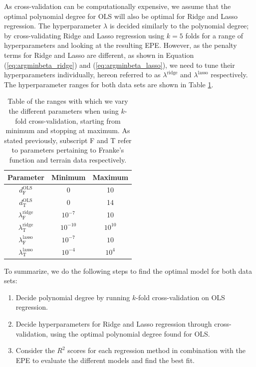 \documentclass[a4paper, 10pt]{article}
\begin{document}
\begin{multicols}{2}
As cross-validation can be computationally expensive, we assume that the optimal polynomial degree for OLS will also be optimal for Ridge and Lasso regression. The hyperparameter $\lambda$ is decided similarly to the polynomial degree; by cross-validating  Ridge and Lasso regression using $k=5$ folds for a range of hyperparameters and looking at the resulting EPE. However, as the penalty terms for Ridge and Lasso are different, as shown in Equation (\ref{eq:argminbeta_ridge}) and (\ref{eq:argminbeta_lasso}),  we need to tune their hyperparameters individually, hereon referred to as $\lambda^\text{ridge}$ and $\lambda^\text{lasso}$ respectively. The hyperparameter ranges for both data sets  are shown in Table \ref{tab:parameters_kfold}.
\begin{table}[H]
\caption{Table of the ranges with which we vary the different parameters when using $k$-fold cross-validation, starting from minimum and stopping at maximum. As stated previously, subscript F and T refer  to parameters pertaining to Franke's function and terrain data respectively.}
\label{tab:parameters_kfold}
\centering
{\setlength{\extrarowheight}{1pt}
\begin{tabular}{| c | c | c |} \hline
Parameter & Minimum & Maximum  \\ \hline
$d_\text{F}^\text{OLS}$ & 0 & 10 \\ \hline
$d_\text{T}^\text{OLS}$ & 0 & 14 \\ \hline
$\lambda^\text{ridge}_\text{F}$  & $10^{-7}$ & 10\\ \hline
$\lambda^\text{ridge}_\text{T}$ & $10^{-10}$ & $10^{10}$\\ \hline
$\lambda^\text{lasso}_\text{F}$  & $10^{-7}$ & $10$\\ \hline
$\lambda^\text{lasso}_\text{T}$ & $10^{-4}$ & $10^{4}$\\ \hline
\end{tabular}}
\end{table}

\noindent
To summarize, we do the following steps to find the optimal model for both data sets:
\begin{enumerate}
\item Decide polynomial degree by running $k$-fold cross-validation on OLS regression.
\item Decide hyperparameters for Ridge and Lasso regression through cross-validation, using the optimal polynomial degree found for OLS.
\item Consider the $R^2$ scores for each regression method in combination with the EPE to evaluate the different models and find the best fit.
\end{enumerate}


\end{multicols}
\end{document}
